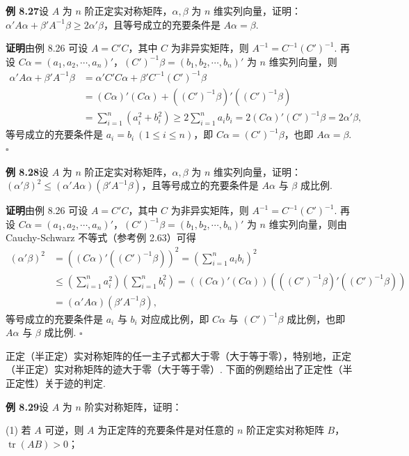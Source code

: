 \documentclass[UTF8,12pt,a4paper,fontset=fandol]{ctexart}
\begin{document}
\noindent\textbf{例 8.27}\quad 设 $A$ 为 $n$ 阶正定实对称矩阵，$\alpha,\beta$ 为 $n$ 维实列向量，证明：$\alpha'A\alpha+\beta'A^{-1}\beta\ge 2\alpha'\beta$，且等号成立的充要条件是 $A\alpha=\beta$.

\noindent\textbf{证明}\quad 由例 8.26 可设 $A=C'C$，其中 $C$ 为非异实矩阵，则 $A^{-1}=C^{-1}(C')^{-1}$. 再设 $C\alpha=(a_1,a_2,\cdots,a_n)'$，$(C')^{-1}\beta=(b_1,b_2,\cdots,b_n)'$ 为 $n$ 维实列向量，则
\[
\begin{aligned}
\alpha'A\alpha+\beta'A^{-1}\beta
&=\alpha'C'C\alpha+\beta'C^{-1}(C')^{-1}\beta\\
&=(C\alpha)'(C\alpha)+((C')^{-1}\beta)'((C')^{-1}\beta)\\
&=\sum_{i=1}^n(a_i^2+b_i^2)\ge 2\sum_{i=1}^n a_ib_i
=2(C\alpha)'(C')^{-1}\beta=2\alpha'\beta,
\end{aligned}
\]
等号成立的充要条件是 $a_i=b_i\ (1\le i\le n)$，即 $C\alpha=(C')^{-1}\beta$，也即 $A\alpha=\beta$. $\ensuremath{\square}$

\noindent\textbf{例 8.28}\quad 设 $A$ 为 $n$ 阶正定实对称矩阵，$\alpha,\beta$ 为 $n$ 维实列向量，证明：$(\alpha'\beta)^2\le (\alpha'A\alpha)(\beta'A^{-1}\beta)$，且等号成立的充要条件是 $A\alpha$ 与 $\beta$ 成比例.

\noindent\textbf{证明}\quad 由例 8.26 可设 $A=C'C$，其中 $C$ 为非异实矩阵，则 $A^{-1}=C^{-1}(C')^{-1}$. 再设 $C\alpha=(a_1,a_2,\cdots,a_n)'$，$(C')^{-1}\beta=(b_1,b_2,\cdots,b_n)'$ 为 $n$ 维实列向量，则由 Cauchy-Schwarz 不等式（参考例 2.63）可得
\[
\begin{aligned}
(\alpha'\beta)^2
&=\left((C\alpha)'((C')^{-1}\beta)\right)^2
=\left(\sum_{i=1}^n a_ib_i\right)^2\\
&\le \left(\sum_{i=1}^n a_i^2\right)\left(\sum_{i=1}^n b_i^2\right)
=\left((C\alpha)'(C\alpha)\right)\left(((C')^{-1}\beta)'((C')^{-1}\beta)\right)\\
&=(\alpha'A\alpha)(\beta'A^{-1}\beta),
\end{aligned}
\]
等号成立的充要条件是 $a_i$ 与 $b_i$ 对应成比例，即 $C\alpha$ 与 $(C')^{-1}\beta$ 成比例，也即 $A\alpha$ 与 $\beta$ 成比例. $\ensuremath{\square}$

正定（半正定）实对称矩阵的任一主子式都大于零（大于等于零），特别地，正定（半正定）实对称矩阵的迹大于零（大于等于零）. 下面的例题给出了正定性（半正定性）关于迹的判定.

\noindent\textbf{例 8.29}\quad 设 $A$ 为 $n$ 阶实对称矩阵，证明：

(1) 若 $A$ 可逆，则 $A$ 为正定阵的充要条件是对任意的 $n$ 阶正定实对称矩阵 $B$，$\operatorname{tr}(AB)>0$；
\end{document}

